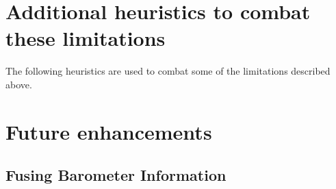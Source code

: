 \section{Additional heuristics to combat these limitations}

The following heuristics are used to combat some of the limitations 
described above.

\section{Future enhancements}
\subsection{Fusing Barometer Information}


